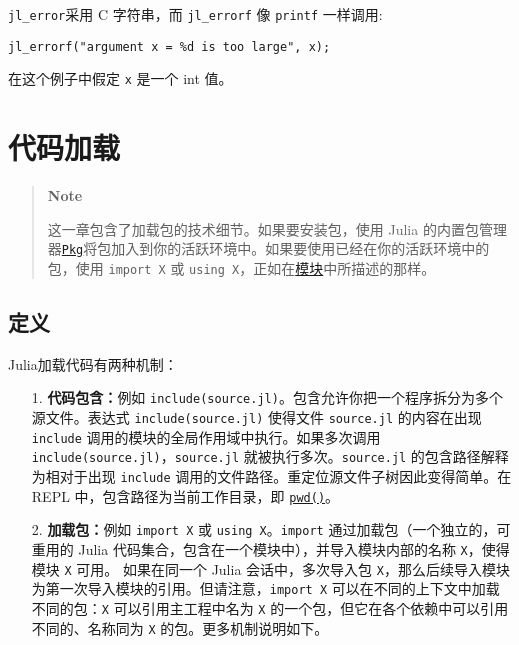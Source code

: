 \texttt{jl\_error}采用 C 字符串，而 \texttt{jl\_errorf} 像 \texttt{printf} 一样调用:




\begin{lstlisting}
jl_errorf("argument x = %d is too large", x);
\end{lstlisting}



在这个例子中假定 \texttt{x} 是一个 int 值。



\hypertarget{15996691828014685993}{}


\chapter{代码加载}



\begin{quote}
\textbf{Note}

这一章包含了加载包的技术细节。如果要安装包，使用 Julia 的内置包管理器\hyperlink{7626139948888930049}{\texttt{Pkg}}将包加入到你的活跃环境中。如果要使用已经在你的活跃环境中的包，使用 \texttt{import X} 或 \texttt{using X}，正如在\hyperlink{7031478671373133429}{模块}中所描述的那样。

\end{quote}


\hypertarget{5148923403283115982}{}


\section{定义}



Julia加载代码有两种机制：



\begin{itemize}
\item[1. ] \textbf{代码包含：}例如 \texttt{include({\textquotedbl}source.jl{\textquotedbl})}。包含允许你把一个程序拆分为多个源文件。表达式 \texttt{include({\textquotedbl}source.jl{\textquotedbl})} 使得文件 \texttt{source.jl} 的内容在出现 \texttt{include} 调用的模块的全局作用域中执行。如果多次调用 \texttt{include({\textquotedbl}source.jl{\textquotedbl})}，\texttt{source.jl} 就被执行多次。\texttt{source.jl} 的包含路径解释为相对于出现 \texttt{include} 调用的文件路径。重定位源文件子树因此变得简单。在 REPL 中，包含路径为当前工作目录，即 \hyperlink{16313884780490629439}{\texttt{pwd()}}。


\item[2. ] \textbf{加载包：}例如 \texttt{import X} 或 \texttt{using X}。\texttt{import} 通过加载包（一个独立的，可重用的 Julia 代码集合，包含在一个模块中），并导入模块内部的名称 \texttt{X}，使得模块 \texttt{X} 可用。 如果在同一个 Julia 会话中，多次导入包 \texttt{X}，那么后续导入模块为第一次导入模块的引用。但请注意，\texttt{import X} 可以在不同的上下文中加载不同的包：\texttt{X} 可以引用主工程中名为 \texttt{X} 的一个包，但它在各个依赖中可以引用不同的、名称同为 \texttt{X} 的包。更多机制说明如下。

\end{itemize}


